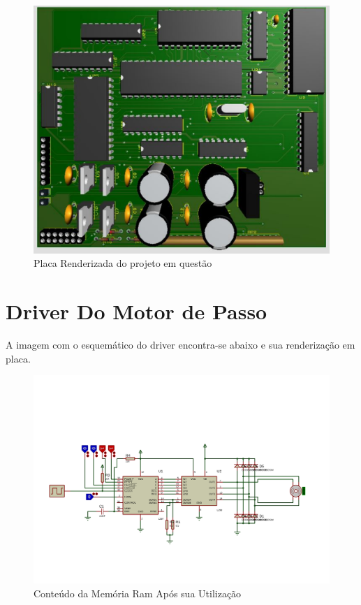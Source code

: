 \documentclass{Fabiano_file}
\begin{document}
\begin{figure}[h!]
\centering
\includegraphics[width=1\textwidth]{Placa_Final.pdf}
\caption{Placa Renderizada do projeto em questão}
\label{fig:adc_8051_dac_ideal}
\end{figure}

\pagebreak

\section{Driver Do Motor de Passo}
A imagem com o esquemático do driver encontra-se abaixo e sua renderização em placa.

\begin{figure}[h!]
\centering
\includegraphics[width=.8\textwidth]{motor_driver.pdf}
\caption{Conteúdo da Memória Ram Após sua Utilização}
\label{fig:adc_8051_dac_ideal}
\end{figure}
\end{document}
